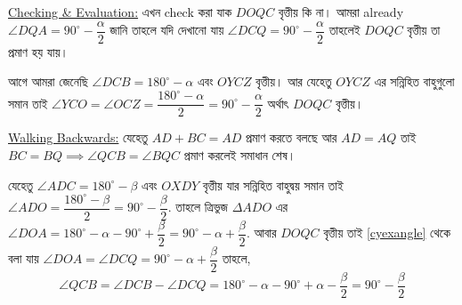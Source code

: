 \documentclass[a4paper,11pt]{article}
\newcommand{\drg}{^{\circ}}
\begin{document}
\underline{Checking \& Evaluation:} 
এখন check করা যাক $DOQC$ বৃত্তীয় কি না। আমরা already $\angle DQA=90\drg-\dfrac{\alpha}{2}$ জানি তাহলে যদি দেখানো যায় $\angle DCQ=90\drg-\dfrac{\alpha}{2}$ তাহলেই $DOQC$ বৃত্তীয় তা প্রমাণ হয় যায়। 

আগে আমরা জেনেছি $\angle DCB=180\drg-\alpha$ এবং $OYCZ$ বৃত্তীয়। আর যেহেতু $OYCZ$ এর সন্নিহিত বাহুগুলো সমান তাই $\angle YCO=\angle OCZ=\dfrac{180\drg-\alpha}{2}=90\drg-\dfrac{\alpha}{2}$ অর্থাৎ $DOQC$ বৃত্তীয়। 

\underline{Walking Backwards:} যেহেতু $AD+BC=AD$ প্রমাণ করতে বলছে আর $AD=AQ$ তাই $BC=BQ \implies \angle QCB=\angle BQC$ প্রমাণ করলেই সমাধান শেষ। 

যেহেতু $\angle ADC=180\drg-\beta$ এবং $OXDY$ বৃত্তীয় যার সন্নিহিত বাহুদ্বয় সমান তাই $\angle ADO=\dfrac{180\drg-\beta}{2}=90\drg-\dfrac{\beta}{2}$. তাহলে ত্রিভুজ $\Delta ADO$ এর $\angle DOA=180\drg-\alpha-90\drg+\dfrac{\beta}{2}=90\drg-\alpha+\dfrac{\beta}{2}$. আবার $DOQC$ বৃত্তীয় তাই \ref{cyexangle} থেকে বলা যায় $\angle DOA=\angle DCQ=90\drg-\alpha+\dfrac{\beta}{2}$ তাহলে, 
\[\angle QCB=\angle DCB-\angle DCQ=180\drg-\alpha-90\drg+\alpha-\dfrac{\beta}{2}=90\drg-\dfrac{\beta}{2}\]
\end{document}
